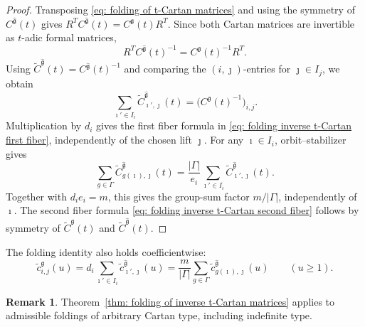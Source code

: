 \documentclass[12pt, leqno]{amsart}
\numberwithin{equation}{section}
\theoremstyle{plain}
\theoremstyle{definition}
\newtheorem{remark}[lemma]{Remark}
\newcommand{\g}{\mathfrak{g}}
\newcommand{\im}{\imath}
\newcommand{\jm}{\jmath}
\newcommand{\tC}{\widetilde{C}}
\newcommand{\tc}{\widetilde{c}}
\newcommand{\hg}{{\widehat{\g}}}
\begin{document}
\begin{proof}
Transposing \eqref{eq: folding of t-Cartan matrices} and using the
symmetry of \(C^\hg(t)\) gives
\(R^TC^\hg(t)=C^\g(t)R^T\).  Since both Cartan matrices are
invertible as \(t\)-adic formal matrices,
\[
R^TC^\hg(t)^{-1}=C^\g(t)^{-1}R^T.
\]
Using \(\tC^\hg(t)=C^\hg(t)^{-1}\) and comparing the
\((i,\jm)\)-entries for \(\jm\in I_j\), we obtain
\[
\sum_{\im'\in I_i}\tC_{\im',\jm}^\hg(t)
=\bigl(C^\g(t)^{-1}\bigr)_{i,j}.
\]
Multiplication by \(d_i\) gives the first fiber formula in
\eqref{eq: folding inverse t-Cartan first fiber}, independently of
the chosen lift \(\jm\).
For any \(\im\in I_i\), orbit--stabilizer gives
\[
\sum_{g\in\Gamma}\tC_{g(\im),\jm}^\hg(t)
=\frac{|\Gamma|}{e_i}\sum_{\im'\in I_i}\tC_{\im',\jm}^\hg(t).
\]
Together with \(d_ie_i=m\), this gives the group-sum factor
\(m/|\Gamma|\), independently of \(\im\).
The second fiber formula
\eqref{eq: folding inverse t-Cartan second fiber} follows by
symmetry of \(\tC^\g(t)\) and \(\tC^\hg(t)\).
\end{proof}

The folding identity also holds coefficientwise:
\[
\tc_{i,j}^\g(u)
= d_i \sum_{\im'\in I_i} \tc_{\im',\jm}^\hg(u)
= \frac{m}{|\Gamma|} \sum_{g\in \Gamma} \tc_{g(\im),\jm}^\hg(u)
\qquad(u\geq1).
\]

\begin{remark}
Theorem~\ref{thm: folding of inverse t-Cartan matrices} applies to
admissible foldings of arbitrary Cartan type, including indefinite type.
\end{remark}
\end{document}
